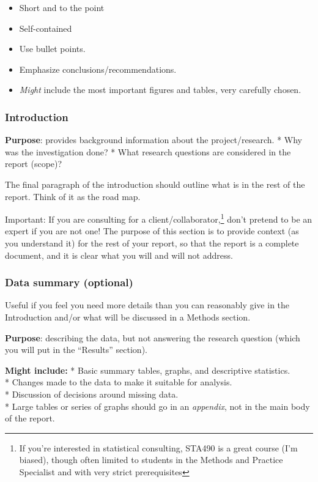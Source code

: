 \documentclass[
  openany]{book}
\providecommand{\tightlist}{%
  \setlength{\itemsep}{0pt}\setlength{\parskip}{0pt}}
\begin{document}
\begin{itemize}
\tightlist
\item
  Short and to the point
\item
  Self-contained
\item
  Use bullet points.
\item
  Emphasize conclusions/recommendations.
\item
  \emph{Might} include the most important figures and tables, very carefully chosen.
\end{itemize}

\hypertarget{introreport}{%
\subsubsection{Introduction}\label{introreport}}

\textbf{Purpose}: provides background information about the project/research.
* Why was the investigation done?
* What research questions are considered in the report (scope)?

The final paragraph of the introduction should outline what is in the rest of the report. Think of it as the road map.

Important: If you are consulting for a client/collaborator,\footnote{If you're interested in statistical consulting, STA490 is a great course (I'm biased), though often limited to students in the Methods and Practice Specialist and with very strict prerequisites} don't pretend to be an expert if you are not one! The purpose of this section is to provide context (as you understand it) for the rest of your report, so that the report is a complete document, and it is clear what you will and will not address.

\hypertarget{data-summary-optional}{%
\subsubsection{Data summary (optional)}\label{data-summary-optional}}

Useful if you feel you need more details than you can reasonably give in the Introduction and/or what will be discussed in a Methods section.

\textbf{Purpose}: describing the data, but not answering the research question (which you will put in the ``Results'' section).

\textbf{Might include:}
* Basic summary tables, graphs, and descriptive statistics.\\
* Changes made to the data to make it suitable for analysis.\\
* Discussion of decisions around missing data.\\
* Large tables or series of graphs should go in an \emph{appendix}, not in the main body of the report.
\end{document}
